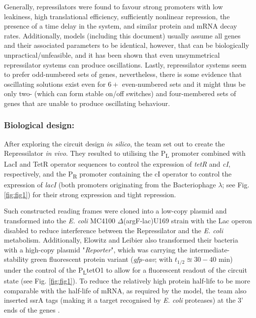 \documentclass[runningheads,a4paper]{llncs}
\begin{document}
Generally, repressilators were found to favour strong promoters with low leakiness, high translational efficiency, sufficiently nonlinear repression, the presence of a time delay in the system, and similar protein and mRNA decay rates. Additionally, models (including this document) usually assume all genes and their associated parameters to be identical\cite{Purcell2010a}, however, that can be biologically unpractical/unfeasible, and it has been shown that even unsymmetrical repressilator systems can produce oscillations\cite{Strelkowa2010}. Lastly, repressilator systems seem to prefer odd-numbered sets of genes, nevertheless, there is some evidence that oscillating solutions exist even for $6+$ even-numbered sets and it might thus be only two- (which can form stable on/off switches) and four-membered sets of genes that are unable to produce oscillating behaviour\cite{Purcell2010a,Strelkowa2010}.

\subsubsection*{Biological design:} 
After exploring the circuit design \textit{in silico}, the team set out to create the Repressilator \textit{in vivo}. They resulted to utilising the P\textsubscript{L} promoter  combined with LacI and TetR operator sequences to control the expression of \textit{tetR} and \textit{cI}, respectively, and the P\textsubscript{R} promoter containing the cI operator to control the expression of \textit{lacI} (both promoters originating from the Bacteriophage $\lambda$; see Fig. \ref{fig:fig1}) for their strong expression and tight repression\cite{Elowitz2000d}. 

Such constructed reading frames were cloned into a low-copy plasmid and transformed into the \textit{E. coli} MC4100 $\Delta$(argF-lac)U169 strain with the Lac operon disabled to reduce interference between the Repressilator and the \textit{E. coli} metabolism\cite{Elowitz2000d}. Additionally, Elowitz and Leibier also transformed their bacteria with a high-copy plasmid "\textit{Reporter}", which was carrying the intermediate-stability green fluorescent protein variant (\textit{gfp-aav}; with $t_{1/2} \approxeq 30-40$ min)\cite{Andersen1998} under the control of the P\textsubscript{L}tetO1 to allow for a fluorescent readout of the circuit state (see Fig. \ref{fig:fig1})\cite{Elowitz2000d}. To reduce the relatively high protein half-life to be more comparable with the half-life of mRNA, as required by the model, the team also inserted ssrA tags (making it a target recognised by \textit{E. coli} proteases) at the 3' ends of the genes \cite{Elowitz2000d}.
\end{document}
